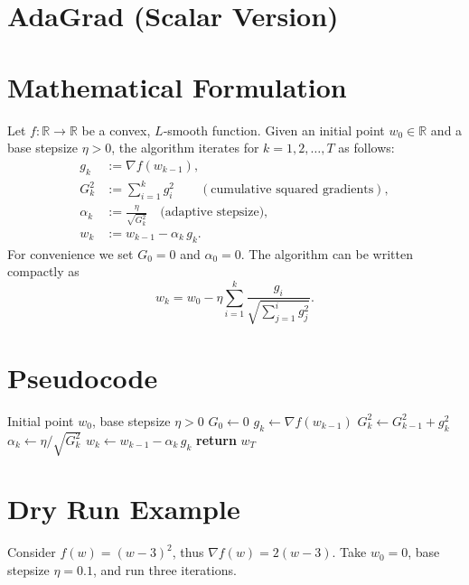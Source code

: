 \documentclass{article}
\begin{document}
\section*{AdaGrad (Scalar Version)}

\section*{Mathematical Formulation}
Let $f:\mathbb{R}\rightarrow\mathbb{R}$ be a convex, $L$‑smooth function.
Given an initial point $w_{0}\in\mathbb{R}$ and a base stepsize $\eta>0$, the
algorithm iterates for $k=1,2,\dots,T$ as follows:
\begin{align}
    g_{k}      &:= \nabla f(w_{k-1}) ,\\[2mm]
    G_{k}^{2}  &:= \sum_{i=1}^{k} g_{i}^{2}\qquad (\text{cumulative squared gradients}),\\[2mm]
    \alpha_{k} &:= \frac{\eta}{\sqrt{G_{k}^{2}}}\quad\text{(adaptive stepsize)},\\[2mm]
    w_{k}      &:= w_{k-1}-\alpha_{k}\,g_{k}.
\end{align}
For convenience we set $G_{0}=0$ and $\alpha_{0}=0$.
The algorithm can be written compactly as
\[
w_{k}=w_{0}-\eta\sum_{i=1}^{k}\frac{g_{i}}{\sqrt{\sum_{j=1}^{i} g_{j}^{2}}}.
\]

\section*{Pseudocode}
\begin{algorithm}[H]
\caption{AdaGrad (scalar)}\label{alg:adagrad}
\begin{algorithmic}[1]
\Require Initial point $w_{0}$, base stepsize $\eta>0$
\State $G_{0}\gets 0$
    \State $g_{k}\gets\nabla f(w_{k-1})$
    \State $G_{k}^{2}\gets G_{k-1}^{2}+g_{k}^{2}$
    \State $\alpha_{k}\gets \eta/\sqrt{G_{k}^{2}}$
    \State $w_{k}\gets w_{k-1}-\alpha_{k}\,g_{k}$
\EndFor
\State \textbf{return} $w_{T}$
\end{algorithmic}
\end{algorithm}

\section*{Dry Run Example}
Consider $f(w)=(w-3)^{2}$, thus $\nabla f(w)=2(w-3)$.  
Take $w_{0}=0$, base stepsize $\eta=0.1$, and run three iterations.
\end{document}
